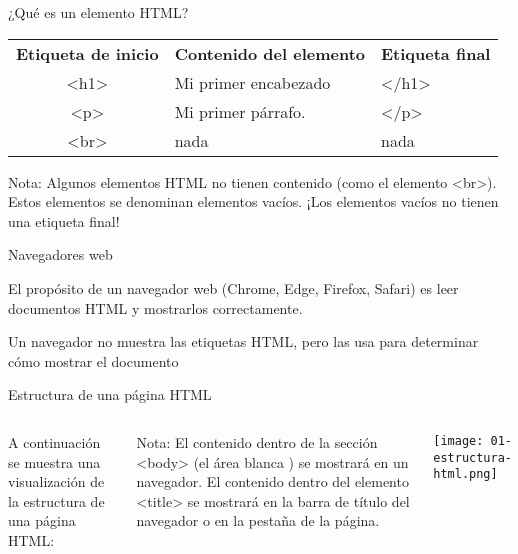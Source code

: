 \begin{frame}[c]{¿Qué es un elemento HTML?}

  \begin{table}[]
  \begin{tabular}{cll}
    \textbf{Etiqueta de inicio} &  \textbf{Contenido del elemento} & \textbf{Etiqueta final} \\
    \rowcolor{light-gray}
    <h1>& Mi primer encabezado & </h1> \\
    <p>& Mi primer párrafo.& </p> \\
    \rowcolor{light-gray}
    <br>&  nada & nada \\
  \end{tabular}
  \end{table}

  \begin{alertblock}{Nota:}
    Algunos elementos HTML no tienen contenido (como el elemento <br>).
    Estos elementos se denominan elementos vacíos. ¡Los elementos vacíos
    no tienen una etiqueta final!
  \end{alertblock}
\end{frame}

\begin{frame}[c]{Navegadores web}

  El propósito de un navegador web (Chrome, Edge, Firefox, Safari)
  es leer documentos HTML y mostrarlos correctamente.

  \vspace{\baselineskip}
  Un navegador no muestra las etiquetas HTML, pero las usa para
  determinar cómo mostrar el documento
\end{frame}

\begin{frame}[c]{Estructura de una página HTML}
  \begin{columns}
      A continuación se muestra una visualización de la
      estructura de una página HTML:

      \begin{exampleblock}{Nota:}
        El contenido dentro de la sección <body> (el área blanca ) se
        mostrará en un navegador. El contenido dentro del elemento <title>
        se mostrará en la barra de título del navegador o en la pestaña de
        la página.
      \end{exampleblock}

      \begin{center}
        \texttt{[image: 01-estructura-html.png]}
      \end{center}
  \end{columns}
\end{frame}

